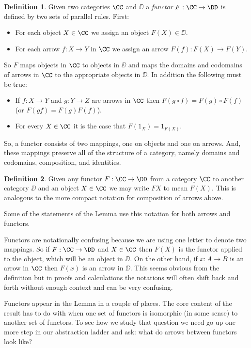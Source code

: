 \documentclass[12pt]{article}
\theoremstyle{definition}
\theoremstyle{definition}
\newtheorem{defn}{Definition}[]
\theoremstyle{definition}
\numberwithin{equation}{section}
\begin{document}
\begin{defn}
Given two categories $\CC$ and $\DD$ a {\it functor} $F : \CC \to \DD$ is defined by two sets of parallel rules. First:
\begin{itemize}
\item For each object $X \in \CC$ we assign an object $F(X) \in \DD$.
\item For each arrow $f: X \to Y$ in $\CC$ we assign an arrow $F(f): F(X) \to F(Y)$.
\end{itemize}
\noindent
So $F$ maps objects in $\CC$ to objects in $\DD$ and maps the domains and codomains of arrows in $\CC$ to the appropriate objects in $\DD$. In addition the following must be true:
\begin{itemize}
\item If $f:X \to Y$ and $g: Y \to Z$ are arrows in $\CC$ then $F(g \circ f) = F(g) \circ F(f)$ (or $F(gf) = F(g)F(f)$).
\item For every $X \in \CC$ it is the case that $F(1_X) = 1_{F(X)}$.
\end{itemize}

\end{defn}
\noindent
So, a functor consists of two mappings, one on objects and one on arrows. And, these mappings preserve all of the structure of a category, 
namely domains and codomains, composition, and identities.

\begin{defn}
Given any functor $F: \CC \to \DD$ from a category $\CC$ to another category $\DD$ and an object $X \in \CC$ we may write $F X$ to mean $F(X)$. This is analogous to the more compact notation for composition of arrows above.
\end{defn}
\noindent
Some of the statements of the Lemma use this notation for both arrows and functors.

Functors are notationally confusing because we are using one letter to denote two mappings. So if $F: \CC \to \DD$ and $X \in \CC$ then $F(X)$ is the functor applied to the object, which will be an object in $\DD$. On the other hand, if $x : A \to B$ is an arrow in $\CC$ then $F(x)$ is an arrow in $\DD$. This seems obvious from the definition but in proofs and calculations the notations will often shift back and forth without enough context and can be very confusing.

Functors appear in the Lemma in a couple of places. The core content of the result has to do with when one set of functors is isomorphic (in some sense) to another set of functors. To see how we study that question we need go up one more step in our abstraction ladder and ask: what do arrows between functors look like?
\end{document}
